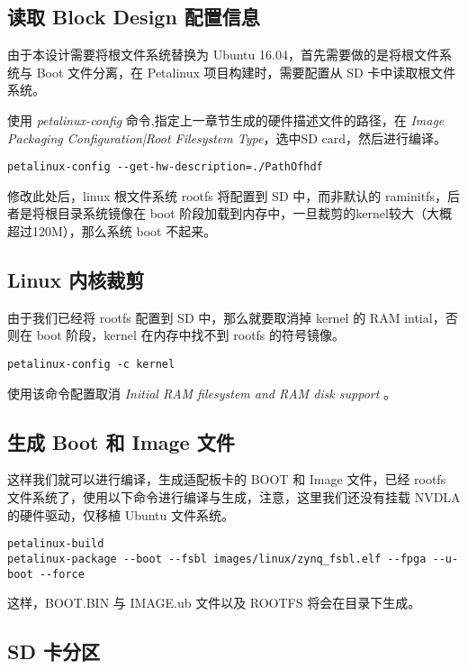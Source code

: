 \subsection{读取 Block Design 配置信息}

由于本设计需要将根文件系统替换为 Ubuntu 16.04，首先需要做的是将根文件系统与 Boot 文件分离，在 Petalinux 项目构建时，需要配置从 SD 卡中读取根文件系统。

使用 \emph{petalinux-config} 命令,指定上一章节生成的硬件描述文件的路径，在 \emph{Image Packaging Configuration|Root Filesystem Type}，选中SD card，然后进行编译。

\begin{lstlisting}
petalinux-config --get-hw-description=./PathOfhdf
\end{lstlisting}

修改此处后，linux 根文件系统 rootfs 将配置到 SD 中，而非默认的  raminitfs，后者是将根目录系统镜像在 boot 阶段加载到内存中，一旦裁剪的kernel较大（大概超过120M），那么系统 boot 不起来。

\subsection{Linux 内核裁剪}

由于我们已经将 rootfs 配置到 SD 中，那么就要取消掉 kernel 的 RAM intial，否则在 boot 阶段，kernel 在内存中找不到 rootfs 的符号镜像。

\begin{lstlisting}
petalinux-config -c kernel
\end{lstlisting}

使用该命令配置取消 \emph{Initial RAM filesystem and RAM disk support} 。

\subsection{生成 Boot 和 Image 文件}

这样我们就可以进行编译，生成适配板卡的 BOOT 和 Image 文件，已经 rootfs 文件系统了，使用以下命令进行编译与生成，注意，这里我们还没有挂载 NVDLA 的硬件驱动，仅移植 Ubuntu 文件系统。

\begin{lstlisting}
petalinux-build
petalinux-package --boot --fsbl images/linux/zynq_fsbl.elf --fpga --u-boot --force
\end{lstlisting}

这样，BOOT.BIN 与 IMAGE.ub 文件以及 ROOTFS 将会在目录下生成。

\subsection{SD 卡分区}

